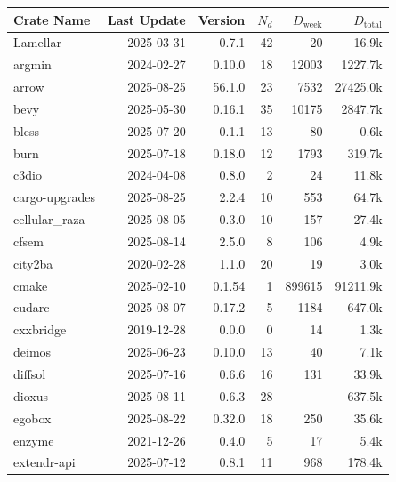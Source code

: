 \documentclass{article}
\begin{document}
\begin{table}
    \centering
    \begin{tabular}{l r r r r r}
        \toprule
        Crate Name &Last Update &Version &$N_d$ &$D_\text{week}$ &$D_\text{total}$\\
        \midrule
        Lamellar         &2025-03-31 &0.7.1      &42   &20       &     16.9k\\
        argmin           &2024-02-27 &0.10.0     &18   &12003    &   1227.7k\\
        arrow            &2025-08-25 &56.1.0     &23   &7532     &  27425.0k\\
        bevy             &2025-05-30 &0.16.1     &35   &10175    &   2847.7k\\
        bless            &2025-07-20 &0.1.1      &13   &80       &      0.6k\\
        burn             &2025-07-18 &0.18.0     &12   &1793     &    319.7k\\
        c3dio            &2024-04-08 &0.8.0      &2    &24       &     11.8k\\
        cargo-upgrades   &2025-08-25 &2.2.4      &10   &553      &     64.7k\\
        cellular\_raza   &2025-08-05 &0.3.0      &10   &157      &     27.4k\\
        cfsem            &2025-08-14 &2.5.0      &8    &106      &      4.9k\\
        city2ba          &2020-02-28 &1.1.0      &20   &19       &      3.0k\\
        cmake            &2025-02-10 &0.1.54     &1    &899615   &  91211.9k\\
        cudarc           &2025-08-07 &0.17.2     &5    &1184     &    647.0k\\
        cxxbridge        &2019-12-28 &0.0.0      &0    &14       &      1.3k\\
        deimos           &2025-06-23 &0.10.0     &13   &40       &      7.1k\\
        diffsol          &2025-07-16 &0.6.6      &16   &131      &     33.9k\\
        dioxus           &2025-08-11 &0.6.3      &28   &         &    637.5k\\
        egobox           &2025-08-22 &0.32.0     &18   &250      &     35.6k\\
        enzyme           &2021-12-26 &0.4.0      &5    &17       &      5.4k\\
        extendr-api      &2025-07-12 &0.8.1      &11   &968      &    178.4k\\

\end{tabular}
\end{table}
\end{document}
